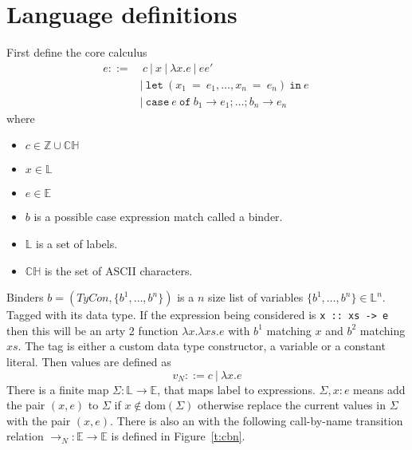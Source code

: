 \documentclass[float=false, crop=false]{standalone}
\numberwithin{subcase}{case}
\newcommand{\tcbn}{\rightarrow_N}
\begin{document}
\section{Language definitions}

First define the core calculus 
\begin{align*}
  e ::=&\ c\ |\ x\ |\ \lambda x.e\ |\ e e'\
  \\ &|\ \mathtt{let}\ (x_1\ \mathtt{=}\ e_1,\dotsc, x_n\ \mathtt{=}\ e_n)\ \mathtt{in}\ e\
  \\ &|\ \mathtt{case}\ e\ \mathtt{of}\ b_1 \rightarrow e_1; \dots; b_n \rightarrow e_n
\end{align*} 
where 
\begin{itemize}
  \item $c\in\mathbb{Z}\cup\mathbb{CH}$ 
  \item $x\in \mathbb{L}$
  \item $e\in\mathbb{E}$ 
  \item $b$ is a possible case expression match called a binder.
  \item $\mathbb{L}$ is a set of labels.
  \item $\mathbb{CH}$ is the set of ASCII characters.
\end{itemize} 

Binders $b = (\mathit{TyCon},\{b^1,\dotsc,b^n\})$ is a $n$ size list of variables 
\mbox{$\{b^1,\dotsc,b^n \}\in \mathbb{L}^n$}. Tagged with its data type. If the expression
being considered is \mbox{\texttt{x :: xs -> e}} then this will be an arty 2 function
$\lambda x.\lambda \mathit{xs}. e$ with $b^1$ matching $x$ and $b^2$ matching $xs$.
The tag is either a custom data type constructor, a variable or a constant literal. 
Then values are defined as \[v_N ::= c\ |\ \lambda x.e \]
There is a finite map $\Sigma : \mathbb{L} 
\rightarrow \mathbb{E}$, that maps label to expressions. 
$\Sigma,x:e$ means add the pair $(x,e)$ to $\Sigma$ if $x \not\in\text{dom}(\Sigma)$
otherwise replace the current values in $\Sigma$ with the pair $(x,e)$.
There is also an with the following call-by-name transition relation 
\mbox{$\tcbn : \mathbb{E} \rightarrow \mathbb{E}$} is defined in Figure~\ref{t:cbn}. 
\end{document}
